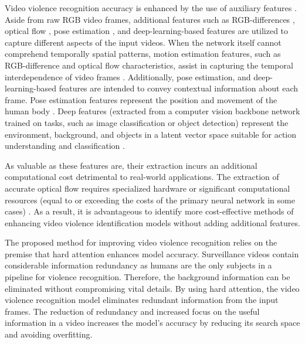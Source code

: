 \documentclass[review]{elsarticle}
\begin{document}
Video violence recognition accuracy is enhanced by the use of auxiliary features \citep{tu2018multi}. Aside from raw RGB video frames, additional features such as RGB-differences \citep{wang2017structured}, optical flow \citep{sevilla2018integration}, pose estimation \citep{luvizon20182d, pham2020unified}, and deep-learning-based features \citep{li2016vlad3, khan2018scale, xiao2019self} are utilized to capture different aspects of the input videos. When the network itself cannot comprehend temporally spatial patterns, motion estimation features, such as RGB-difference and optical flow characteristics, assist in capturing the temporal interdependence of video frames \citep{wang2018appearance}. Additionally, pose estimation, and deep-learning-based features are intended to convey contextual information about each frame. Pose estimation features represent the position and movement of the human body \citep{luvizon20182d, pham2020unified}. Deep features (extracted from a computer vision backbone network trained on tasks, such as image classification or object detection) represent the environment, background, and objects in a latent vector space suitable for action understanding and classification \citep{li2016vlad3, khan2018scale, xiao2019self}.

As valuable as these features are, their extraction incurs an additional computational cost detrimental to real-world applications. The extraction of accurate optical flow requires specialized hardware or significant computational resources (equal to or exceeding the costs of the primary neural network in some cases) \citep{sun2018optical}. As a result, it is advantageous to identify more cost-effective methods of enhancing video violence identification models without adding additional features.

The proposed method for improving video violence recognition relies on the premise that hard attention enhances model accuracy. Surveillance videos contain considerable information redundancy as humans are the only subjects in a pipeline for violence recognition. Therefore, the background information can be eliminated without compromising vital details\citep{sharma2015action}. By using hard attention, the video violence recognition model eliminates redundant information from the input frames. The reduction of redundancy and increased focus on the useful information in a video increases the model's accuracy by reducing its search space and avoiding overfitting.
\end{document}

